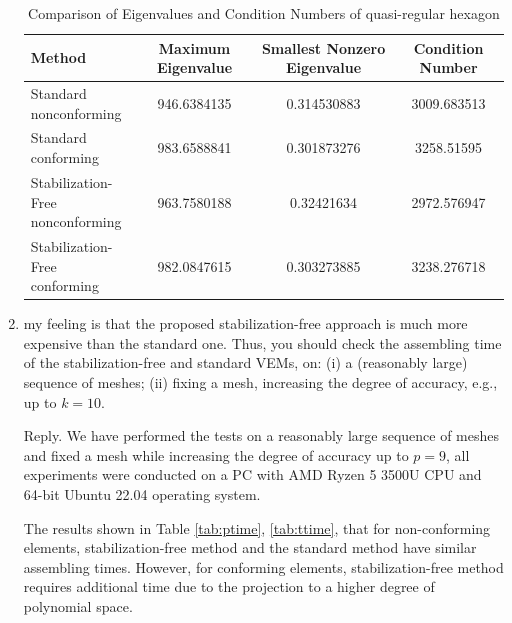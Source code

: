 \documentclass[10pt]{amsart}
\theoremstyle{definition}
\theoremstyle{remark}
\begin{document}
\begin{enumerate}[1.]
\begin{table}[h]
\centering
\caption{Comparison of Eigenvalues and Condition Numbers of quasi-regular hexagon}
\label{tab:comparison2}
\begin{tabular}{|l|c|c|c|}
\hline
\textbf{Method} & \textbf{Maximum Eigenvalue} & \textbf{Smallest Nonzero
Eigenvalue} & \textbf{Condition Number} \\ \hline
\thead{Standard \\ nonconforming} & 946.6384135 & 0.314530883 & 3009.683513 \\ \hline
\thead{Standard \\conforming} & 983.6588841 & 0.301873276 & 3258.51595 \\ \hline
\thead{Stabilization-Free \\nonconforming} & 963.7580188 & 0.32421634 & 2972.576947 \\ \hline
\thead{Stabilization-Free\\ conforming} & 982.0847615 & 0.303273885 & 3238.276718 \\ \hline
\end{tabular}
\end{table}


\item \textsf{
my feeling is that the proposed stabilization-free approach is much more
expensive than the standard one. Thus, you should check the assembling time
of the stabilization-free and standard VEMs, on: (i) a (reasonably large)
sequence of meshes; (ii) fixing a mesh, increasing the degree of accuracy,
e.g., up to $k = 10$.
}

\smallskip \noindent \textcolor[rgb]{1.00,0.00,0.00}{Reply.}
We have performed the tests on a reasonably large sequence of meshes and fixed a
mesh while increasing the degree of accuracy up to $p = 9$, all experiments were
conducted on a PC with AMD Ryzen 5 3500U CPU and 64-bit Ubuntu 22.04 
operating system. 

The results shown in Table \ref{tab:ptime}, \ref{tab:ttime}, that
for non-conforming elements, stabilization-free method and the standard method 
have similar assembling times. However, for conforming elements,
stabilization-free method
requires additional time due to the projection to a higher degree of polynomial
space.


\end{enumerate}
\end{document}

